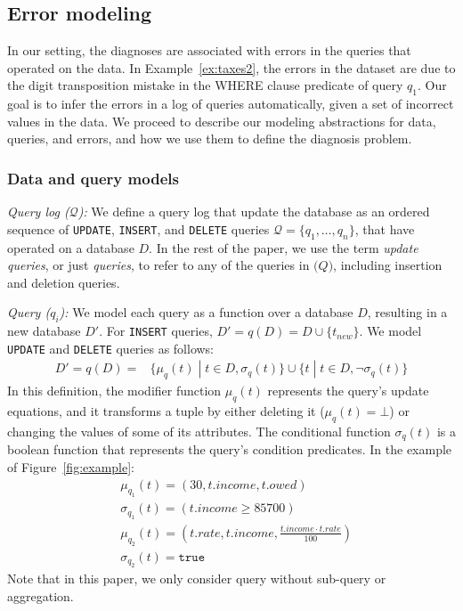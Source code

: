 

\subsection{Error modeling}
\label{sec:model}

In our setting, the diagnoses are associated with errors in the queries that
operated on the data. In Example~\ref{ex:taxes2}, the errors in the dataset
are due to the digit transposition mistake in the WHERE clause predicate of
query $q_1$. Our goal is to infer the errors in a log of queries
automatically, given a set of incorrect values in the data. We proceed to
describe our modeling abstractions for data, queries, and errors, and how we
use them to define the diagnosis problem.

\subsubsection*{Data and query models}
\label{sec:models}

\noindent
\emph{Query log ($\mathcal{Q}$):}
We define a query log that update the database 
as an ordered sequence of \texttt{UPDATE}, \texttt{INSERT}, and
\texttt{DELETE} queries $\mathcal{Q}=\{q_1,\dots,q_n\}$, that have
operated on a database $D$. In the rest of the paper, we use the term
\emph{update queries}, or just \emph{queries}, to refer to any of the queries in $\mathcal(Q)$,
including insertion and deletion queries.

\smallskip
\noindent
\emph{Query ($q_i$):} We model each query as a function over a
database $D$, resulting in a new database $D'$. For \texttt{INSERT}
queries, $D'=q(D)=D\cup\{t_{new}\}$.
We model \texttt{UPDATE} and \texttt{DELETE} queries as follows:  
\begin{align*}
    D'=q(D)= &\{\mu_{q}(t)\;|\;t\in D, \sigma_{q}(t)\}%
    \cup\{t\;|\;t\in D, \neg\sigma_{q}(t)\}%
\end{align*}
% 
In this definition, the modifier function $\mu_q(t)$ represents the query's update equations, and it transforms a tuple by either deleting it ($\mu_q(t)=\bot$) or changing the values of some of its attributes.
The conditional function $\sigma_q(t)$ is a boolean function that represents the query's condition predicates.  In the example of Figure~\ref{fig:example}:
\begin{align*}
    &\mu_{q_1}(t)=(30, t.income, t.owed)\\
    &\sigma_{q_1}(t)=(t.income\ge 85700)\\
    &\mu_{q_2}(t)=(t.rate, t.income, \frac{t.income\cdot t.rate}{100})\\
    &\sigma_{q_2}(t)=\texttt{true}
\end{align*} 
Note that in this paper, we only consider query without sub-query or aggregation. 
% 


